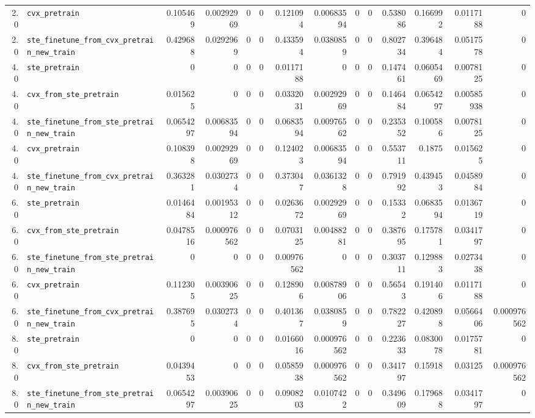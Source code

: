 \begin{longtable}{@{}r l *{12}{r}@{}}
2.0 & \texttt{cvx\_pretrain} & 0.105469 & 0.00292969 & 0 & 0 & 0.121094 & 0.00683594 & 0 & 0 & 0.538086 & 0.166992 & 0.0117188 & 0 \\
2.0 & \texttt{ste\_finetune\_from\_cvx\_pretrain\_new\_train} & 0.429688 & 0.0292969 & 0 & 0 & 0.433594 & 0.0380859 & 0 & 0 & 0.802734 & 0.396484 & 0.0517578 & 0 \\
4.0 & \texttt{ste\_pretrain} & 0 & 0 & 0 & 0 & 0.0117188 & 0 & 0 & 0 & 0.147461 & 0.0605469 & 0.0078125 & 0 \\
4.0 & \texttt{cvx\_from\_ste\_pretrain} & 0.015625 & 0 & 0 & 0 & 0.0332031 & 0.00292969 & 0 & 0 & 0.146484 & 0.0654297 & 0.00585938 & 0 \\
4.0 & \texttt{ste\_finetune\_from\_ste\_pretrain\_new\_train} & 0.0654297 & 0.00683594 & 0 & 0 & 0.0683594 & 0.00976562 & 0 & 0 & 0.235352 & 0.100586 & 0.0078125 & 0 \\
4.0 & \texttt{cvx\_pretrain} & 0.108398 & 0.00292969 & 0 & 0 & 0.124023 & 0.00683594 & 0 & 0 & 0.553711 & 0.1875 & 0.015625 & 0 \\
4.0 & \texttt{ste\_finetune\_from\_cvx\_pretrain\_new\_train} & 0.363281 & 0.0302734 & 0 & 0 & 0.373047 & 0.0361328 & 0 & 0 & 0.791992 & 0.439453 & 0.0458984 & 0 \\
6.0 & \texttt{ste\_pretrain} & 0.0146484 & 0.00195312 & 0 & 0 & 0.0263672 & 0.00292969 & 0 & 0 & 0.15332 & 0.0683594 & 0.0136719 & 0 \\
6.0 & \texttt{cvx\_from\_ste\_pretrain} & 0.0478516 & 0.000976562 & 0 & 0 & 0.0703125 & 0.00488281 & 0 & 0 & 0.387695 & 0.175781 & 0.0341797 & 0 \\
6.0 & \texttt{ste\_finetune\_from\_ste\_pretrain\_new\_train} & 0 & 0 & 0 & 0 & 0.00976562 & 0 & 0 & 0 & 0.303711 & 0.129883 & 0.0273438 & 0 \\
6.0 & \texttt{cvx\_pretrain} & 0.112305 & 0.00390625 & 0 & 0 & 0.128906 & 0.00878906 & 0 & 0 & 0.56543 & 0.191406 & 0.0117188 & 0 \\
6.0 & \texttt{ste\_finetune\_from\_cvx\_pretrain\_new\_train} & 0.387695 & 0.0302734 & 0 & 0 & 0.401367 & 0.0380859 & 0 & 0 & 0.782227 & 0.420898 & 0.0566406 & 0.000976562 \\
8.0 & \texttt{ste\_pretrain} & 0 & 0 & 0 & 0 & 0.0166016 & 0.000976562 & 0 & 0 & 0.223633 & 0.0830078 & 0.0175781 & 0 \\
8.0 & \texttt{cvx\_from\_ste\_pretrain} & 0.0439453 & 0 & 0 & 0 & 0.0585938 & 0.000976562 & 0 & 0 & 0.341797 & 0.15918 & 0.03125 & 0.000976562 \\
8.0 & \texttt{ste\_finetune\_from\_ste\_pretrain\_new\_train} & 0.0654297 & 0.00390625 & 0 & 0 & 0.0908203 & 0.0107422 & 0 & 0 & 0.349609 & 0.179688 & 0.0341797 & 0 \\

\end{longtable}
